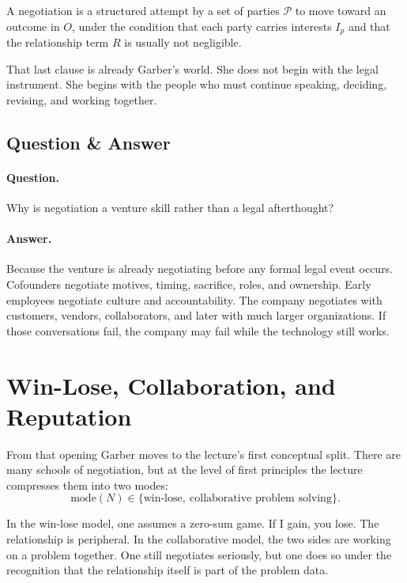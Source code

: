 \begin{definition}
A negotiation is a structured attempt by a set of parties \(\mathcal{P}\) to move toward an outcome in \(O\), under the condition that each party carries interests \(I_p\) and that the relationship term \(R\) is usually not negligible.
\end{definition}

That last clause is already Garber's world. She does not begin with the legal instrument. She begins with the people who must continue speaking, deciding, revising, and working together.

\subsection{Question \& Answer}

\paragraph{Question.} Why is negotiation a venture skill rather than a legal afterthought?

\paragraph{Answer.} Because the venture is already negotiating before any formal legal event occurs. Cofounders negotiate motives, timing, sacrifice, roles, and ownership. Early employees negotiate culture and accountability. The company negotiates with customers, vendors, collaborators, and later with much larger organizations. If those conversations fail, the company may fail while the technology still works.

\section{Win-Lose, Collaboration, and Reputation}

From that opening Garber moves to the lecture's first conceptual split. There are many schools of negotiation, but at the level of first principles the lecture compresses them into two modes:
\begin{equation}
\mathrm{mode}(N) \in \{\text{win-lose},\ \text{collaborative problem solving}\}.
\end{equation}

In the win-lose model, one assumes a zero-sum game. If I gain, you lose. The relationship is peripheral. In the collaborative model, the two sides are working on a problem together. One still negotiates seriously, but one does so under the recognition that the relationship itself is part of the problem data.


